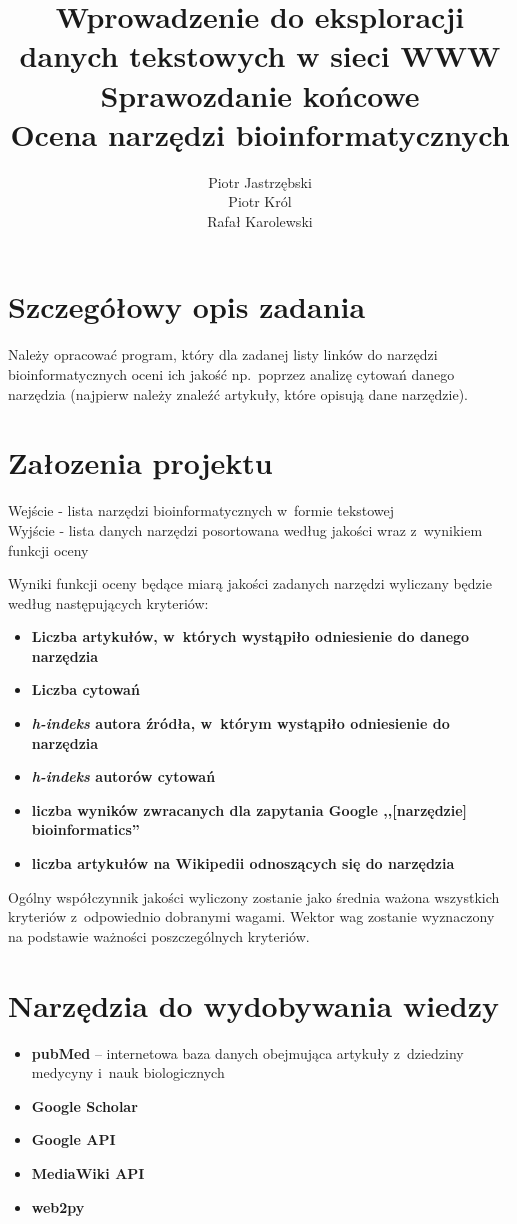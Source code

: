 \documentclass[11pt,a4paper]{article}
\title{Wprowadzenie do eksploracji danych tekstowych w sieci WWW\\ Sprawozdanie końcowe\\ \large Ocena narzędzi bioinformatycznych}
\author{Piotr Jastrzębski\\ Piotr Król \\ Rafał Karolewski}
\date{}
\begin{document}
\maketitle

\section{Szczegółowy opis zadania}\label{opis}
Należy opracować program, który dla zadanej listy linków do narzędzi bioinformatycznych oceni ich jakość np.~poprzez analizę cytowań danego narzędzia (najpierw należy znaleźć artykuły, które opisują dane narzędzie).

\section{Załozenia projektu}

Wejście - lista narzędzi bioinformatycznych w~formie tekstowej\\
Wyjście - lista danych narzędzi posortowana według jakości wraz z~wynikiem funkcji oceny

Wyniki funkcji oceny będące miarą jakości zadanych narzędzi wyliczany będzie według następujących kryteriów:
\begin{itemize}
	\item \textbf{Liczba artykułów, w~których wystąpiło odniesienie do danego narzędzia}
	\item \textbf{Liczba cytowań}
	\item \textbf{\emph{h-indeks} autora źródła, w~którym wystąpiło odniesienie do narzędzia }
	\item \textbf{\emph{h-indeks} autorów cytowań}
	\item \textbf{liczba wyników zwracanych dla zapytania Google ,,[narzędzie] bioinformatics''}
	\item \textbf{liczba artykułów na Wikipedii odnoszących się do narzędzia}
\end{itemize}

Ogólny współczynnik jakości wyliczony zostanie jako średnia ważona wszystkich kryteriów z~odpowiednio dobranymi wagami. Wektor wag zostanie wyznaczony na podstawie ważności poszczególnych kryteriów.

\section{Narzędzia do wydobywania wiedzy}

\begin{itemize}
\item \textbf{pubMed} --  internetowa baza danych obejmująca artykuły z~dziedziny medycyny i~nauk biologicznych \cite{pubMed}
\item \textbf{Google Scholar} \cite{scholar}
\item \textbf{Google API} \cite{googleApi}
\item \textbf{MediaWiki API} \cite{mediaWiki}
\item \textbf{web2py} \cite{web2py}
\end{itemize}
\end{document}

